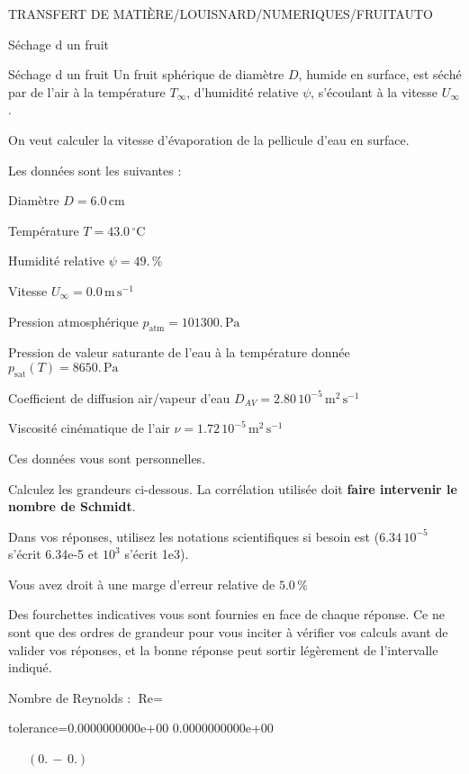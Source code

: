 \documentclass[12pt]{article}
\begin{document}
\begin{quiz}{TRANSFERT DE MATIÈRE/LOUISNARD/NUMERIQUES/FRUITAUTO}
\begin{cloze}{Séchage d un fruit}
\end{cloze} 


 \begin{cloze}{Séchage d un fruit} 
Un fruit sphérique de diamètre $D$, humide en surface, est séché par de l'air à la température $T_\infty$, d'humidité relative $\psi$, s'écoulant à la vitesse $U_\infty$.

On veut calculer la vitesse d'évaporation de la pellicule d'eau en surface.

 

Les données sont les suivantes :

 

Diamètre $D = 6.0\,  \mathrm{cm} $

Température $T = 43.0\,  \mathrm{^\circ\mathrm{C}} $

Humidité relative $\psi = 49.\, \% $

Vitesse $U_\infty = 0.0\,  \mathrm{m}\,  \mathrm{s}^{-1} $

Pression atmosphérique $p_{\text{atm}} = 101300.\,  \mathrm{Pa} $

Pression de valeur saturante de l’eau à la température donnée $p_{\text{sat}}(T) = 8650.\,  \mathrm{Pa} $

Coefficient de diffusion air/vapeur d’eau $D_{AV} =  2.80 \, 10^{-5} \,  \mathrm{m}^{2}\,  \mathrm{s}^{-1} $

Viscosité cinématique de l’air $\nu =  1.72 \, 10^{-5} \,  \mathrm{m}^{2}\,  \mathrm{s}^{-1} $

Ces données vous sont personnelles.

 

Calculez les grandeurs ci-dessous. La corrélation utilisée doit \textbf{faire intervenir le nombre de Schmidt}.

Dans vos réponses, utilisez les notations scientifiques si besoin est ($6.34\, 10^{-5}$ s'écrit 6.34e-5 et $10^{3}$ s'écrit 1e3).

Vous avez droit à une marge d'erreur relative de $5.0\, \% $

Des fourchettes indicatives vous sont fournies en face de chaque réponse. Ce ne sont que des ordres de grandeur pour vous inciter à vérifier vos calculs avant de valider vos réponses, et la bonne réponse peut sortir légèrement de l'intervalle indiqué.

 

Nombre de Reynolds : $\text{Re} =  $
\begin{numerical}[points=1] 
\item[tolerance={0.0000000000e+00}] 0.0000000000e+00 
\end{numerical} 
 $\,$ 
 $ \quad (0. \, - \, 0.) $ 


\end{cloze}
\end{quiz}
\end{document}
